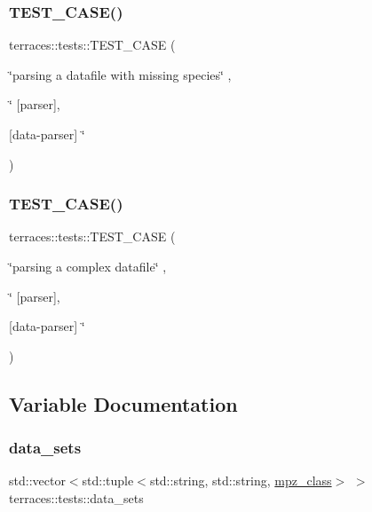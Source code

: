 \subsubsection{\texorpdfstring{T\+E\+S\+T\+\_\+\+C\+A\+S\+E()}{TEST\_CASE()}\hspace{0.1cm}{\footnotesize\ttfamily [77/78]}}
{\footnotesize\ttfamily terraces\+::tests\+::\+T\+E\+S\+T\+\_\+\+C\+A\+SE (\begin{DoxyParamCaption}\item[{\char`\"{}parsing a datafile with missing species\char`\"{}}]{,  }\item[{\char`\"{}}]{\mbox{[}parser\mbox{]},  }\item[{\mbox{[}data-\/parser\mbox{]} \char`\"{}}]{ }\end{DoxyParamCaption})}

\mbox{\label{namespaceterraces_1_1tests_a946b3521e68709d5223cf99e3152950b}} 
\subsubsection{\texorpdfstring{T\+E\+S\+T\+\_\+\+C\+A\+S\+E()}{TEST\_CASE()}\hspace{0.1cm}{\footnotesize\ttfamily [78/78]}}
{\footnotesize\ttfamily terraces\+::tests\+::\+T\+E\+S\+T\+\_\+\+C\+A\+SE (\begin{DoxyParamCaption}\item[{\char`\"{}parsing a complex datafile\char`\"{}}]{,  }\item[{\char`\"{}}]{\mbox{[}parser\mbox{]},  }\item[{\mbox{[}data-\/parser\mbox{]} \char`\"{}}]{ }\end{DoxyParamCaption})}



\subsection{Variable Documentation}
\mbox{\label{namespaceterraces_1_1tests_a1ea2bfc31a1006c1da7a3b96372b008a}} 
\subsubsection{\texorpdfstring{data\+\_\+sets}{data\_sets}}
{\footnotesize\ttfamily std\+::vector$<$std\+::tuple$<$std\+::string, std\+::string, \hyperlink{gmpxx_8h_a4194ba637e08ba88fb6b56747cc0ee6c}{mpz\+\_\+class}$>$ $>$ terraces\+::tests\+::data\+\_\+sets}

